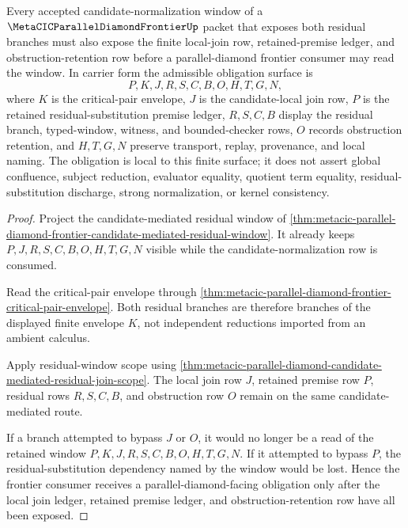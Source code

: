\begin{theorem}
\label{thm:metacic-parallel-diamond-frontier-residual-join-obligation}
Every accepted candidate-normalization window of a $\MetaCICParallelDiamondFrontierUp$ packet that exposes both residual branches must also expose the finite local-join row, retained-premise ledger, and obstruction-retention row before a parallel-diamond frontier consumer may read the window. In carrier form the admissible obligation surface is
$$
P,K,J,R,S,C,B,O,H,T,G,N ,
$$
where $K$ is the critical-pair envelope, $J$ is the candidate-local join row, $P$ is the retained residual-substitution premise ledger, $R,S,C,B$ display the residual branch, typed-window, witness, and bounded-checker rows, $O$ records obstruction retention, and $H,T,G,N$ preserve transport, replay, provenance, and local naming. The obligation is local to this finite surface; it does not assert global confluence, subject reduction, evaluator equality, quotient term equality, residual-substitution discharge, strong normalization, or kernel consistency.
\end{theorem}
\begin{proof}
Project the candidate-mediated residual window of \autoref{thm:metacic-parallel-diamond-frontier-candidate-mediated-residual-window}. It already keeps $P,J,R,S,C,B,O,H,T,G,N$ visible while the candidate-normalization row is consumed.

Read the critical-pair envelope through \autoref{thm:metacic-parallel-diamond-frontier-critical-pair-envelope}. Both residual branches are therefore branches of the displayed finite envelope $K$, not independent reductions imported from an ambient calculus.

Apply residual-window scope using \autoref{thm:metacic-parallel-diamond-candidate-mediated-residual-join-scope}. The local join row $J$, retained premise row $P$, residual rows $R,S,C,B$, and obstruction row $O$ remain on the same candidate-mediated route.

If a branch attempted to bypass $J$ or $O$, it would no longer be a read of the retained window $P,K,J,R,S,C,B,O,H,T,G,N$. If it attempted to bypass $P$, the residual-substitution dependency named by the window would be lost. Hence the frontier consumer receives a parallel-diamond-facing obligation only after the local join ledger, retained premise ledger, and obstruction-retention row have all been exposed.
\end{proof}
